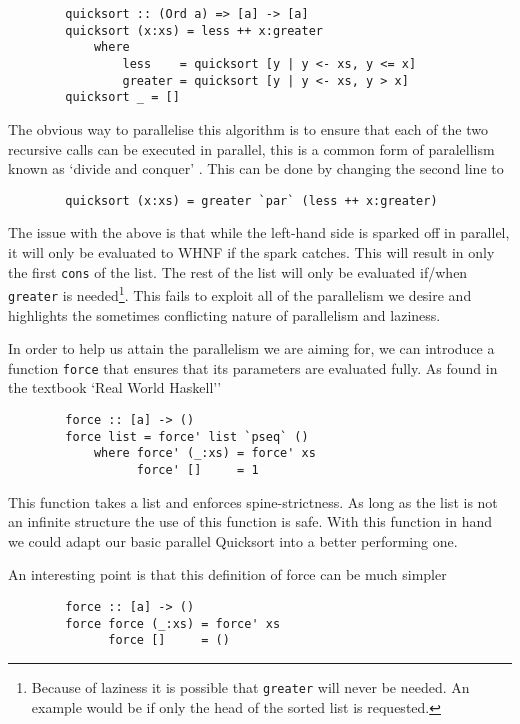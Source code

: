 \begin{verbatim}
        quicksort :: (Ord a) => [a] -> [a]
        quicksort (x:xs) = less ++ x:greater
            where
                less    = quicksort [y | y <- xs, y <= x]
                greater = quicksort [y | y <- xs, y > x]
        quicksort _ = []
\end{verbatim}

The obvious way to parallelise this algorithm is to ensure that each of the two
recursive calls can be executed in parallel, this is a common form of
paralellism known as `divide and conquer' . This can be done by changing the second line to

\begin{verbatim}
        quicksort (x:xs) = greater `par` (less ++ x:greater)
\end{verbatim}

The issue with the above is that while the left-hand side is sparked off in
parallel, it will only be evaluated to WHNF if the spark catches. This will
result in only the first \verb=cons= of the list. The rest of the list will
only be evaluated if/when \verb=greater= is needed\footnote{Because of
laziness it is possible that \texttt{greater} will never be needed. An
example would be if only the head of the sorted list is requested.}. This
fails to exploit all of the parallelism we desire and highlights the sometimes
conflicting nature of parallelism and laziness.

    In order to help us attain the parallelism we are aiming for, we can
introduce a function \verb=force= that ensures that its parameters are evaluated
fully. As found in the textbook `Real World Haskell'' \citep{realWorld}

\begin{verbatim}
        force :: [a] -> ()
        force list = force' list `pseq` ()
            where force' (_:xs) = force' xs
                  force' []     = 1
\end{verbatim}

This function takes a list and enforces spine-strictness. As long as the list is
not an infinite structure the use of this function is safe. With this function
in hand we could adapt our basic parallel Quicksort into a better performing one.

An interesting point is that this definition of force can be much simpler

\begin{verbatim}
        force :: [a] -> ()
        force force (_:xs) = force' xs
              force []     = ()
\end{verbatim}

